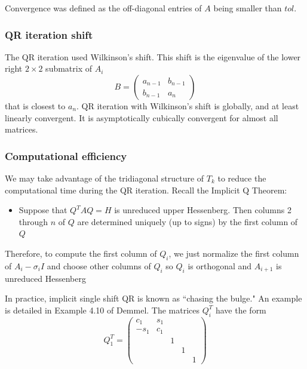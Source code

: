 \documentclass[11pt]{article} %
\begin{document}
Convergence was defined as the off-diagonal entries of $A$ being smaller than $tol$.

\subsubsection{QR iteration shift}
The QR iteration used Wilkinson's shift. This shift is the eigenvalue of the lower right $2 \times 2$ submatrix of $A_i$
\begin{equation}
B = \left ( \begin{array}{cc}
a_{n-1} & b_{n-1} \\
b_{n-1} & a_n
\end{array} \right )
\end{equation}
 that is closest to $a_n$. QR iteration with Wilkinson's shift is globally, and at least linearly convergent. It is asymptotically cubically convergent for almost all matrices.

\subsubsection{Computational efficiency}

We may take advantage of the tridiagonal structure of $T_k$ to reduce the computational time during the QR iteration. Recall the Implicit Q Theorem:

\begin{itemize}
\item Suppose that $Q^T A Q = H$ is unreduced upper Hessenberg. Then columns 2 through $n$ of $Q$ are determined uniquely (up to signs) by the first column of $Q$
\end{itemize}
Therefore, to compute the first column of $Q_i$, we just normalize the first column of $A_i - \sigma_i I$ and choose other columns of $Q_i$ so $Q_i$ is orthogonal and $A_{i+1}$ is unreduced Hessenberg

In practice, implicit single shift QR is known as ``chasing the bulge." An example is detailed in Example 4.10 of Demmel.  The matrices $Q_i^T$ have the form
\begin{equation}
Q_1^T = \left ( \begin{array}{rrrrr}
c_1&  s_1&  & &\\
 -s_1 & c_1&  & & \\
&&1&&\\
 &  & & 1& \\
 & & && 1 
\end{array} \right )
\end{equation}
\end{document}
